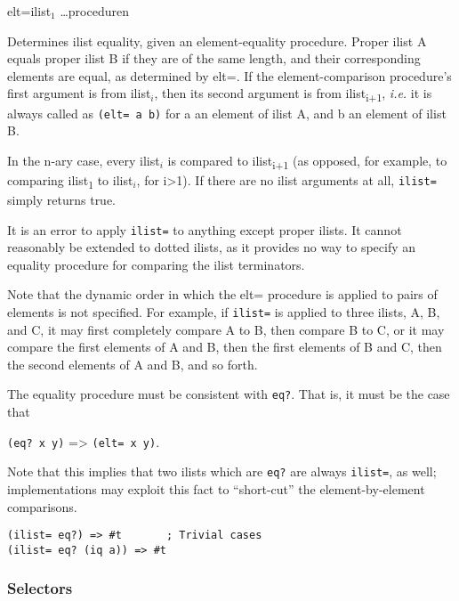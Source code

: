 \begin{entry}{%
  \Proto elt={ilist$_1$ \ldots}{procedure}{n}}

  Determines ilist equality, given an
  element-equality procedure. Proper ilist A equals proper ilist B if
  they are of the same length, and their corresponding elements are
  equal, as determined by elt=. If the element-comparison procedure's
  first argument is from ilist$_i$, then its second
  argument is from ilist\textsubscript{i+1}, \emph{i.e.} it is always
  called as \texttt{(elt=\ a\ b)} for a an element of ilist A, and b
  an element of ilist B.

  In the n-ary case, every ilist$_i$ is compared to
  ilist\textsubscript{i+1} (as opposed, for example, to comparing
  ilist\textsubscript{1} to ilist$_i$, for
  i\textgreater{}1).  If there are no ilist arguments at all,
  \texttt{ilist=} simply returns true.

  It is an error to apply \texttt{ilist=} to anything except proper
  ilists. It cannot reasonably be extended to dotted ilists, as it
  provides no way to specify an equality procedure for comparing the
  ilist terminators.

  Note that the dynamic order in which the elt= procedure is applied
  to pairs of elements is not specified. For example, if
  \texttt{ilist=} is applied to three ilists, A, B, and C, it may
  first completely compare A to B, then compare B to C, or it may
  compare the first elements of A and B, then the first elements of B
  and C, then the second elements of A and B, and so forth.

  The equality procedure must be consistent with \texttt{eq?}. That
  is, it must be the case that

  \texttt{(eq?\ x\ y)} =\textgreater{} \texttt{(elt=\ x\ y)}.

  Note that this implies that two ilists which are \texttt{eq?} are
  always \texttt{ilist=}, as well; implementations may exploit this
  fact to ``short-cut'' the element-by-element comparisons.

\begin{verbatim}
(ilist= eq?) => #t       ; Trivial cases
(ilist= eq? (iq a)) => #t
\end{verbatim}
\end{entry}

\subsubsection{{Selectors}}\label{selectors}


